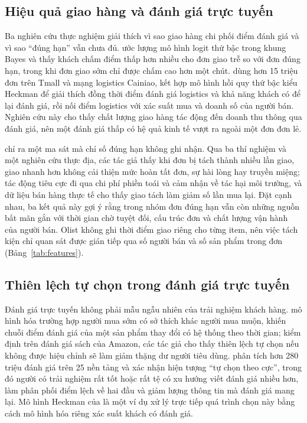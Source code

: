 \documentclass[12pt,a4paper]{report}
\begin{document}
\subsection{Hiệu quả giao hàng và đánh giá trực tuyến}\label{sec:rel-delivery}

Ba nghiên cứu thực nghiệm giải thích vì sao giao hàng chi phối điểm đánh giá và vì sao ``đúng hạn'' vẫn chưa đủ. \textcite{ravula2023} ước lượng mô hình logit thứ bậc trong khung Bayes và thấy khách chấm điểm thấp hơn nhiều cho đơn giao trễ so với đơn đúng hạn, trong khi đơn giao sớm chỉ được chấm cao hơn một chút. \textcite{deshpande2023} dùng hơn 15 triệu đơn trên Tmall và mạng logistics Cainiao, kết hợp mô hình hồi quy thứ bậc kiểu Heckman để giải thích đồng thời điểm đánh giá logistics và khả năng khách có để lại đánh giá, rồi nối điểm logistics với xác suất mua và doanh số của người bán. Nghiên cứu này cho thấy chất lượng giao hàng tác động đến doanh thu thông qua đánh giá, nên một đánh giá thấp có hệ quả kinh tế vượt ra ngoài một đơn đơn lẻ.

\textcite{brylla2022} chỉ ra một ma sát mà chỉ số đúng hạn không ghi nhận. Qua ba thí nghiệm và một nghiên cứu thực địa, các tác giả thấy khi đơn bị tách thành nhiều lần giao, giao nhanh hơn không cải thiện mức hoàn tất đơn, sự hài lòng hay truyền miệng; tác động tiêu cực đi qua chi phí phiền toái và cảm nhận về tác hại môi trường, và dữ liệu bán hàng thực tế cho thấy giao tách làm giảm số lần mua lại. Đặt cạnh nhau, ba kết quả này gợi ý rằng trong nhóm đơn đúng hạn vẫn còn những nguồn bất mãn gắn với thời gian chờ tuyệt đối, cấu trúc đơn và chất lượng vận hành của người bán. Olist không ghi thời điểm giao riêng cho từng item, nên việc tách kiện chỉ quan sát được gián tiếp qua số người bán và số sản phẩm trong đơn (Bảng~\ref{tab:features}).

\subsection{Thiên lệch tự chọn trong đánh giá trực tuyến}\label{sec:rel-selection}

Đánh giá trực tuyến không phải mẫu ngẫu nhiên của trải nghiệm khách hàng. \textcite{li2008} mô hình hóa trường hợp người mua sớm có sở thích khác người mua muộn, khiến chuỗi điểm đánh giá của một sản phẩm thay đổi có hệ thống theo thời gian; kiểm định trên đánh giá sách của Amazon, các tác giả cho thấy thiên lệch tự chọn nếu không được hiệu chỉnh sẽ làm giảm thặng dư người tiêu dùng. \textcite{schoenmueller2020} phân tích hơn 280 triệu đánh giá trên 25 nền tảng và xác nhận hiện tượng ``tự chọn theo cực'', trong đó người có trải nghiệm rất tốt hoặc rất tệ có xu hướng viết đánh giá nhiều hơn, làm phân phối điểm lệch về hai đầu và giảm lượng thông tin mà đánh giá mang lại. Mô hình Heckman của \textcite{deshpande2023} là một ví dụ xử lý trực tiếp quá trình chọn này bằng cách mô hình hóa riêng xác suất khách có đánh giá.
\end{document}
